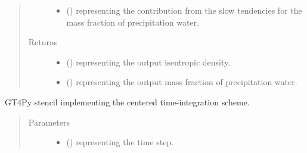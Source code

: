 \documentclass[letterpaper,10pt,english]{sphinxmanual}
\begin{document}
\begin{fulllineitems}
\begin{fulllineitems}
\begin{quote}
\begin{description}
\begin{itemize}
\item {} 
 () \textendash{}  representing the contribution from the slow tendencies for the mass fraction of
precipitation water.

\end{itemize}

\item[{Returns}] \leavevmode
\begin{itemize}
\item {} 
 () \textendash{}  representing the output isentropic density.

\item {} 
 () \textendash{}  representing the output mass fraction of precipitation water.

\end{itemize}


\end{description}\end{quote}

\end{fulllineitems}


\begin{fulllineitems}
\label{\detokenize{api:dycore.prognostic_isentropic_centered.PrognosticIsentropicCentered._stencil_stepping_by_neglecting_vertical_advection_defs}}
GT4Py stencil implementing the centered time-integration scheme.
\begin{quote}\begin{description}
\item[{Parameters}] \leavevmode\begin{itemize}
\item {} 
 () \textendash{}  representing the time step.


\end{itemize}
\end{description}
\end{quote}
\end{fulllineitems}
\end{fulllineitems}
\end{document}
